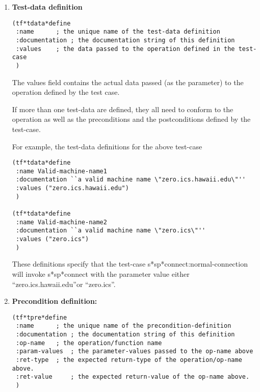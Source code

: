 \begin {enumerate}
\noindent For example, the operation definition for the test-case above

\small\begin{verbatim}
(tf*toper*define
 :name Normal-connection
 :documentation ``expects the return-value \"zero.ics.hawaii.edu\"''
 :op-name s*sp*connect
 :ret-type object
 :ret-value "zero.ics.hawaii.edu"
 )
\end{verbatim}\normalsize

This definition specifies that the function s*sp*connect will return
``zero.ics.hawaii.edu'' when its corresponding test case is run regardless
of the test data being supplied (in this case, both Valid-machine-name1 
and Valid-machine-name2 are applicable)

\item {\bf Test-data definition}

\small\begin{verbatim}
(tf*tdata*define
 :name		; the unique name of the test-data definition 
 :documentation ; the documentation string of this definition
 :values	; the data passed to the operation defined in the test-case
 )
\end{verbatim}\normalsize

The values field contains the actual data passed (as the parameter) to the 
operation defined by the test case.

If more than one test-data are defined, they all need to conform to the
operation as well as the preconditions and the postconditions defined 
by the test-case.

\noindent For example, the test-data definitions for the above test-case

\small\begin{verbatim}
(tf*tdata*define
 :name Valid-machine-name1
 :documentation ``a valid machine name \"zero.ics.hawaii.edu\"''
 :values ("zero.ics.hawaii.edu")
 )

(tf*tdata*define
 :name Valid-machine-name2
 :documentation ``a valid machine name \"zero.ics\"''
 :values ("zero.ics")
 )
\end{verbatim}\normalsize

These definitions specify that the test-case s*sp*connect:normal-connection
will invoke s*sp*connect with the parameter value either
``zero.ics.hawaii.edu''or ``zero.ics''.

\item {\bf Precondition definition:}

\small\begin{verbatim}
(tf*tpre*define
 :name 		; the unique name of the precondition-definition
 :documentation ; the documentation string of this definition	
 :op-name 	; the operation/function name
 :param-values  ; the parameter-values passed to the op-name above
 :ret-type 	; the expected return-type of the operation/op-name above.
 :ret-value 	; the expected return-value of the op-name above.
 )
\end{verbatim}\normalsize


\end{enumerate}
